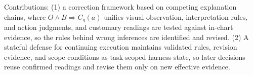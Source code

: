 Contributions: (1) a correction framework based on
competing explanation chains, where
$O\land B\Rightarrow C_q(a)$ unifies visual observation,
interpretation rules, and action judgments, and
customary readings are tested against in-chart evidence, so the rules behind wrong inferences are identified and revised. (2) A stateful defense for continuing execution maintains validated rules, revision evidence, and scope conditions as task-scoped harness state, so later decisions reuse confirmed readings and revise them only on new effective evidence.

